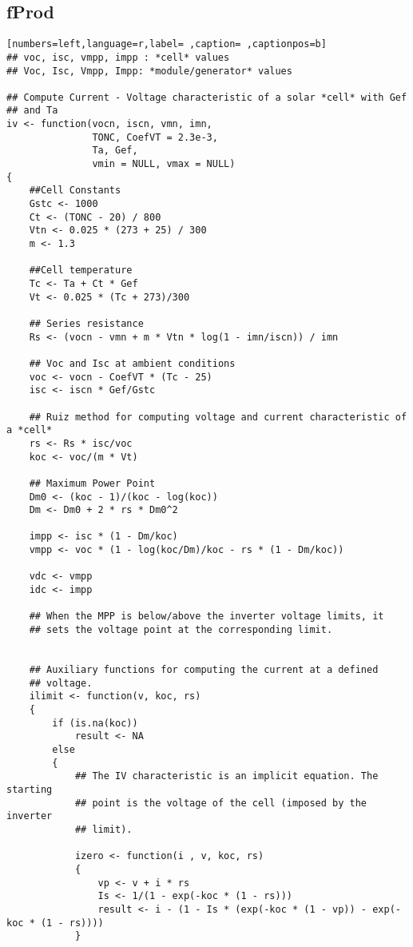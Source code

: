 \subsection{fProd}
\label{sec:orgb97156a}
\begin{lstlisting}[numbers=left,language=r,label= ,caption= ,captionpos=b]
## voc, isc, vmpp, impp : *cell* values
## Voc, Isc, Vmpp, Impp: *module/generator* values

## Compute Current - Voltage characteristic of a solar *cell* with Gef
## and Ta
iv <- function(vocn, iscn, vmn, imn,
               TONC, CoefVT = 2.3e-3,
               Ta, Gef,
               vmin = NULL, vmax = NULL)
{
    ##Cell Constants
    Gstc <- 1000
    Ct <- (TONC - 20) / 800
    Vtn <- 0.025 * (273 + 25) / 300
    m <- 1.3

    ##Cell temperature
    Tc <- Ta + Ct * Gef
    Vt <- 0.025 * (Tc + 273)/300

    ## Series resistance
    Rs <- (vocn - vmn + m * Vtn * log(1 - imn/iscn)) / imn

    ## Voc and Isc at ambient conditions
    voc <- vocn - CoefVT * (Tc - 25)
    isc <- iscn * Gef/Gstc

    ## Ruiz method for computing voltage and current characteristic of a *cell*
    rs <- Rs * isc/voc
    koc <- voc/(m * Vt)

    ## Maximum Power Point
    Dm0 <- (koc - 1)/(koc - log(koc))
    Dm <- Dm0 + 2 * rs * Dm0^2

    impp <- isc * (1 - Dm/koc)
    vmpp <- voc * (1 - log(koc/Dm)/koc - rs * (1 - Dm/koc))

    vdc <- vmpp
    idc <- impp

    ## When the MPP is below/above the inverter voltage limits, it
    ## sets the voltage point at the corresponding limit.


    ## Auxiliary functions for computing the current at a defined
    ## voltage.
    ilimit <- function(v, koc, rs) 
    {
        if (is.na(koc)) 
            result <- NA
        else
        {
            ## The IV characteristic is an implicit equation. The starting
            ## point is the voltage of the cell (imposed by the inverter
            ## limit). 

            izero <- function(i , v, koc, rs)
            {
                vp <- v + i * rs
                Is <- 1/(1 - exp(-koc * (1 - rs)))
                result <- i - (1 - Is * (exp(-koc * (1 - vp)) - exp(-koc * (1 - rs))))
            }


\end{lstlisting}
